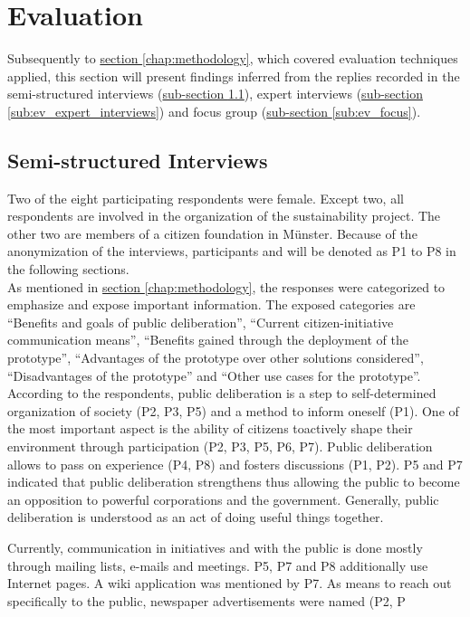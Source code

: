\section{Evaluation}
\label{chap:evaluation}
Subsequently to \hyperref[chap:methodology]{section \ref{chap:methodology}}, which covered evaluation techniques applied, this section will present findings inferred from the replies recorded in the semi-structured interviews (\hyperref[sub:ev_interviews]{sub-section \ref{sub:ev_interviews}}), expert interviews (\hyperref[sub:ev_expert_interviews]{sub-section \ref{sub:ev_expert_interviews}}) and focus group (\hyperref[sub:ev_focus]{sub-section \ref{sub:ev_focus}}).


\subsection{Semi-structured Interviews}
\label{sub:ev_interviews}
Two of the eight participating respondents were female. Except two, all respondents are involved in the organization of the sustainability project. The other two are members of a citizen foundation in M{\"u}nster. Because of the anonymization of the interviews, participants and will be denoted as P1 to P8 in the following sections.\\
As mentioned in \hyperref[chap:methodology]{section \ref{chap:methodology}}, the responses were categorized to emphasize and expose important information. The exposed categories are ``Benefits and goals of public deliberation'', ``Current citizen-initiative communication means'', ``Benefits gained through the deployment of the prototype'', ``Advantages of the prototype over other solutions considered'', ``Disadvantages of the prototype'' and ``Other use cases for the prototype''.\\

According to the respondents, public deliberation is a step to self-determined organization of society (P2, P3, P5) and a method to inform oneself (P1). One of the most important aspect is the ability of citizens toactively shape their environment through participation (P2, P3, P5, P6, P7). Public deliberation allows to pass on experience (P4, P8) and fosters discussions (P1, P2). P5 and P7 indicated that public deliberation strengthens thus allowing the public to become an opposition to powerful corporations and the government. Generally, public deliberation is understood as an act of doing useful things together.

Currently, communication in initiatives and with the public is done mostly through mailing lists, e-mails and meetings. P5, P7 and P8 additionally use Internet pages. A wiki application was mentioned by P7. As means to reach out specifically to the public, newspaper advertisements were named (P2, P


